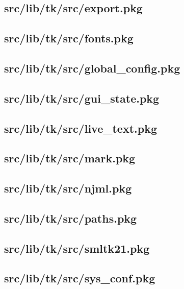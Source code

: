 \subsection{src/lib/tk/src/export.pkg}


\subsection{src/lib/tk/src/fonts.pkg}


\subsection{src/lib/tk/src/global\_config.pkg}


\subsection{src/lib/tk/src/gui\_state.pkg}


\subsection{src/lib/tk/src/live\_text.pkg}


\subsection{src/lib/tk/src/mark.pkg}


\subsection{src/lib/tk/src/njml.pkg}


\subsection{src/lib/tk/src/paths.pkg}


\subsection{src/lib/tk/src/smltk21.pkg}


\subsection{src/lib/tk/src/sys\_conf.pkg}


